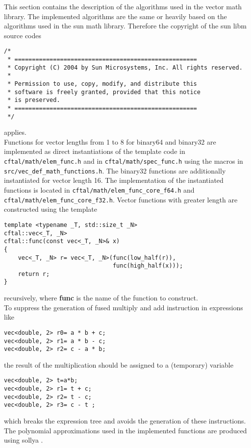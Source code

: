\documentclass[10pt,a4paper,final,oneside]{article}
\numberwithin{equation}{subsection}
\begin{document}
This section contains the description of the algorithms used in the
vector math library. The implemented algorithms are the same or
heavily based on the algorithms used in the sun math
library. Therefore the copyright of the sun libm source codes
\small
\begin{verbatim}
/*
 * ====================================================
 * Copyright (C) 2004 by Sun Microsystems, Inc. All rights reserved.
 *
 * Permission to use, copy, modify, and distribute this
 * software is freely granted, provided that this notice
 * is preserved.
 * ====================================================
 */
\end{verbatim}
\normalsize
applies.\\[10pt]
%
Functions for vector lengths from 1 to 8 for binary64 and binary32 are implemented as direct instantiations of the template code in
\lstinline{cftal/math/elem_func.h}
and in \lstinline{cftal/math/spec_func.h}
using the macros in
\lstinline{src/vec_def_math_functions.h}.
The binary32 functions are additionally instantiated for vector length 16.
The implementation of the instantiated functions is located in
\lstinline{cftal/math/elem_func_core_f64.h} and
\lstinline{cftal/math/elem_func_core_f32.h}.
Vector functions with greater length are constructed using the template
\begin{lstlisting}
template <typename _T, std::size_t _N>
cftal::vec<_T, _N>
cftal::func(const vec<_T, _N>& x)
{
    vec<_T, _N> r= vec<_T, _N>(func(low_half(r)),
                               func(high_half(x)));
    return r;
}
\end{lstlisting}
recursively, where \textbf{func} is the name of the
function to construct.\\[10pt]
%
To suppress the generation of fused multiply and add instruction
in expressions like
\begin{lstlisting}
vec<double, 2> r0= a * b + c;
vec<double, 2> r1= a * b - c;
vec<double, 2> r2= c - a * b;
\end{lstlisting}
the result of the multiplication should be assigned to a (temporary)
variable
\begin{lstlisting}
vec<double, 2> t=a*b;
vec<double, 2> r1= t + c;
vec<double, 2> r2= t - c;
vec<double, 2> r3= c - t ;
\end{lstlisting}
which breaks the expression tree and avoids the generation of these
instructions.\\[10pt]
%
The polynomial approximations used in the implemented functions
are produced using sollya \cite{ChevillardJoldesLauter2010}.
\end{document}
